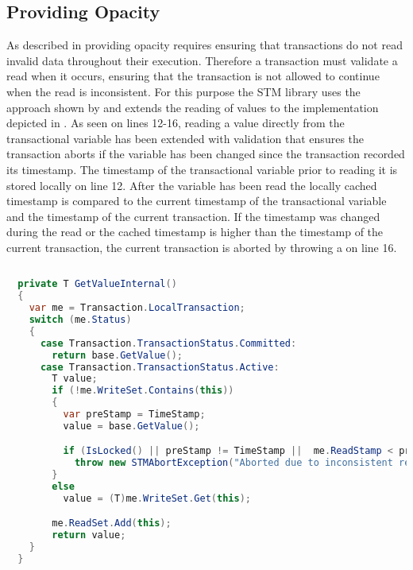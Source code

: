 \subsection{Providing Opacity}
As described in  providing opacity requires ensuring that transactions do not read invalid data throughout their execution. Therefore a transaction must validate a read when it occurs, ensuring that the transaction is not allowed to continue when the read is inconsistent. For this purpose the \ac{STM} library uses the approach shown by \cite[p. 117]{harris2010transactional} and extends the reading of values to the implementation depicted in . As seen on lines 12-16, reading a value directly from the transactional variable has been extended with validation that ensures the transaction aborts if the variable has been changed since the transaction recorded its timestamp. The timestamp of the transactional variable prior to reading it is stored locally on line 12. After the variable has been read the locally cached timestamp is compared to the current timestamp of the transactional variable and the timestamp of the current transaction. If the timestamp was changed during the read or the cached timestamp is higher than the timestamp of the current transaction, the current transaction is aborted by throwing a  on line 16.
\begin{lstlisting}[float,label=lst:library_opacity,
  caption={Providing Opacity},
  language=Java,  
  showspaces=false,
  showtabs=false,
  breaklines=true,
  showstringspaces=false,
  breakatwhitespace=true,
  commentstyle=\color{greencomments},
  keywordstyle=\color{bluekeywords},
  stringstyle=\color{redstrings},
  morekeywords={atomic, retry, orElse, var, get, set}]  % Start your code-block
  
  private T GetValueInternal()
  {
    var me = Transaction.LocalTransaction;
    switch (me.Status)
    {
      case Transaction.TransactionStatus.Committed:
        return base.GetValue();
      case Transaction.TransactionStatus.Active:
        T value;
        if (!me.WriteSet.Contains(this))
        {
          var preStamp = TimeStamp;
          value = base.GetValue();

          if (IsLocked() || preStamp != TimeStamp ||  me.ReadStamp < preStamp)
            throw new STMAbortException("Aborted due to inconsistent read");
        }
        else
          value = (T)me.WriteSet.Get(this);

        me.ReadSet.Add(this);
        return value;
    }
  }
\end{lstlisting}

